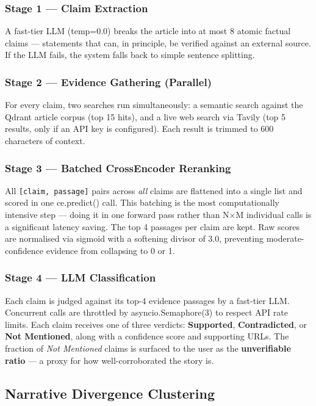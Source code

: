 \documentclass[9pt,a4paper,twocolumn]{article}
\newcommand{\code}[1]{{\ttfamily\small\color{steel}#1}}
\begin{document}
\subsubsection{Stage 1 — Claim Extraction}
A fast-tier LLM (temp=0.0) breaks the article into at most 8 atomic factual claims — statements that can, in principle, be verified against an external source. If the LLM fails, the system falls back to simple sentence splitting.

\subsubsection{Stage 2 — Evidence Gathering (Parallel)}
For every claim, two searches run simultaneously: a semantic search against the Qdrant article corpus (top 15 hits), and a live web search via Tavily (top 5 results, only if an API key is configured). Each result is trimmed to 600 characters of context.

\subsubsection{Stage 3 — Batched CrossEncoder Reranking}
All \texttt{[claim, passage]} pairs across \textit{all} claims are flattened into a single list and scored in one \code{ce.predict()} call. This batching is the most computationally intensive step — doing it in one forward pass rather than N×M individual calls is a significant latency saving. The top 4 passages per claim are kept. Raw scores are normalised via sigmoid with a softening divisor of 3.0, preventing moderate-confidence evidence from collapsing to 0 or 1.

\subsubsection{Stage 4 — LLM Classification}
Each claim is judged against its top-4 evidence passages by a fast-tier LLM. Concurrent calls are throttled by \code{asyncio.Semaphore(3)} to respect API rate limits. Each claim receives one of three verdicts: \textbf{Supported}, \textbf{Contradicted}, or \textbf{Not Mentioned}, along with a confidence score and supporting URLs. The fraction of \textit{Not Mentioned} claims is surfaced to the user as the \textbf{unverifiable ratio} — a proxy for how well-corroborated the story is.

\subsection{Narrative Divergence Clustering}
\end{document}
